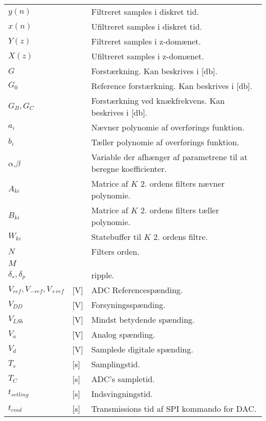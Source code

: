 \begin{table}[h!]
\begin{threeparttable}
\begin{tabular}{l l l}
$y(n)$\tnote{*}	    &		            & Filtreret samples i diskret tid.	\\
$x(n)$\tnote{*}	    &		            & Ufiltreret samples i diskret tid.	\\
$Y(z)$\tnote{*}	    &		            & Filtreret samples i z-domænet.	\\
$X(z)$\tnote{*}	    &		            & Ufiltreret samples i  z-domænet.	\\
$G$\tnote{*}		&   				& Forstærkning. Kan beskrives i [\si{\decibel}].\\
$G_0$\tnote{*}		&   				& Reference forstærkning. Kan beskrives i [\si{\decibel}].\\
$G_B,G_C$\tnote{*}	&   				& Forstærkning ved knækfrekvens. Kan beskrives i [\si{\decibel}].\\
$a_i$\tnote{*}	    &   				& Nævner polynomie af overførings funktion.\\
$b_i$\tnote{*}	    &   				& Tæller polynomie af overførings funktion.\\
$\alpha$\tnote{*},$\beta$\tnote{*}	    &   			& Variable der afhænger af parametrene til at beregne koefficienter.\\
$A_{ki}$\tnote{*}	    &   			& Matrice af $K$ 2. ordens filters nævner polynomie.\\
$B_{ki}$\tnote{*}	    &   			& Matrice af $K$ 2. ordens filters tæller polynomie.\\
$W_{ki}$\tnote{*}	    &   			& Statebuffer til $K$ 2. ordens filtre.\\
$N$\tnote{*}        &                   & Filters orden.\\
$M$\tnote{*}        &                   & \\   
$\delta_s, \delta_p$\tnote{*}	&   				& ripple.\\
$V_{ref},V_{-ref},V_{+ref}$ & [\si{\volt}] & ADC Referencespænding. \\
$V_{DD}$ & [\si{\volt}] & Forsyningsspænding. \\
$V_{LSb}$ & [\si{\volt}] & Mindst betydende spænding. \\
$V_a$ &[\si{\volt}] & Analog spænding. \\
$V_d$ & [\si{\volt}]& Samplede digitale spænding.\\
$T_s$ & [\si{\second}] & Samplingstid. \\
$T_C$ &[\si{\second}] & ADC's sampletid. \\
$t_{setling}$ &[\si{\second}] & Indsvingningstid. \\
$t_{cmd}$ & [\si{\second}] & Transmissions tid af SPI kommando for DAC.\\

\end{tabular}
\end{threeparttable}
\end{table}
